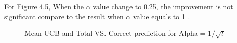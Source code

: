 For Figure 4.5, When the $\alpha$ value change to 0.25, the improvement is not significant compare to the result when $\alpha$ value equals to 1 .
\begin{figure}[htbp]
\centering
{}%
%
\centering
\caption{ Mean UCB and Total VS. Correct prediction for
Alpha = ${1}/{\sqrt{t}}$}
\end{figure}  

